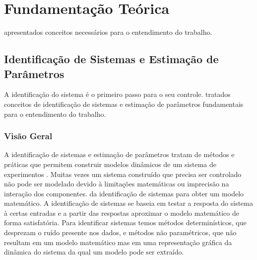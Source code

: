 \chapter{ Fundamentação Teórica} \label{cap2}


 apresentados conceitos necessários para o entendimento do trabalho. 


\section{Identificação de Sistemas e Estimação de Parâmetros}
A identificação do sistema é o primeiro passo para o seu controle.   tratados conceitos de identificação de sistemas e estimação de parâmetros fundamentais para o entendimento do trabalho.

\subsection{Visão Geral}
A identificação de sistemas e estimação de parâmetros  tratam de métodos e práticas que permitem construir modelos dinâmicos de um sistema  de experimentos . Muitas vezes um sistema construído que precisa ser controlado não pode ser modelado devido à limitações matemáticas ou imprecisão na interação dos componentes.  da identificação de sistemas para obter um modelo matemático. A identificação de sistemas se baseia em testar a resposta do sistema à certas entradas e a partir das respostas aproximar o modelo matemático de forma satisfatória. Para identificar sistemas temos métodos determinísticos, que desprezam o ruído presente nos dados, e métodos não paramétricos, que não resultam em um modelo matemático mas em uma representação gráfica da dinâmica do sistema da qual um modelo pode ser extraído. 


